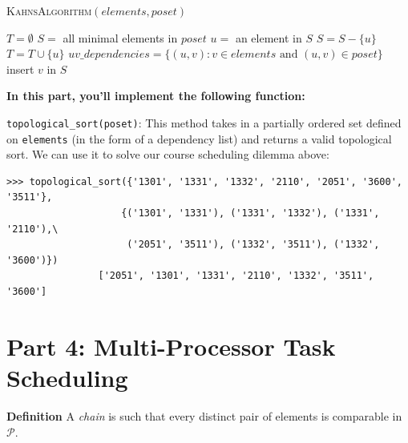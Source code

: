 \documentclass{article}
\begin{document}
    \begin{algorithm}
        \caption{\textsc{KahnsAlgorithm}$(elements, poset)$}\label{alg:cap}
        \label{alg:topological_sort}
        \begin{algorithmic}
            \State $T = \emptyset$
            \State $S = $ all minimal elements in $poset$
                \State $u = $ an element in $S$
                \State $S = S - \{u\}$
                \State $T = T \cup \{u\}$
                \State $uv\_dependencies = \{(u, v) : v \in elements \text{ and }(u, v) \in poset\}$
                     insert $v$ in $S$ \EndIf
                \EndFor

            \EndWhile
            
                
            \State {}
        \end{algorithmic}
    \end{algorithm}


    \vspace{3mm}
    \begin{tcolorbox}[colback=yellow!30]
        \textbf{In this part, you'll implement the following function:}
        
        \lstinline{topological_sort(poset)}: This method takes in a partially ordered set defined on \lstinline{elements} (in the form of a dependency list) and returns a valid topological sort. We can use it to solve our course scheduling dilemma above:

        \begin{lstlisting}[belowskip=-10pt]
            >>> topological_sort({'1301', '1331', '1332', '2110', '2051', '3600', '3511'},
                    {('1301', '1331'), ('1331', '1332'), ('1331', '2110'),\
                     ('2051', '3511'), ('1332', '3511'), ('1332', '3600')})
                ['2051', '1301', '1331', '2110', '1332', '3511', '3600']
        \end{lstlisting}
    \end{tcolorbox}

\section*{Part 4: Multi-Processor Task Scheduling}

    \textbf{Definition} A \textit{chain} is such that every distinct pair of elements is comparable in $\mathcal{P}$.
\end{document}
